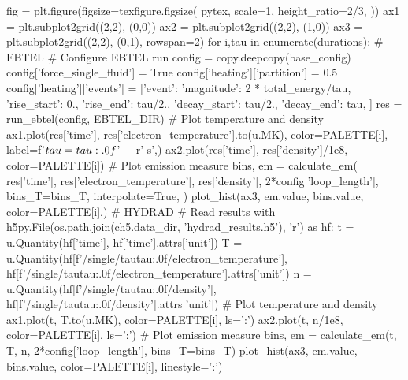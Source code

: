 \begin{pycode}[chapter5]
fig = plt.figure(figsize=texfigure.figsize(
    pytex,
    scale=1,
    height_ratio=2/3,
))
ax1 = plt.subplot2grid((2,2), (0,0))
ax2 = plt.subplot2grid((2,2), (1,0))
ax3 = plt.subplot2grid((2,2), (0,1), rowspan=2)
for i,tau in enumerate(durations):
    # EBTEL
    # Configure EBTEL run
    config = copy.deepcopy(base_config)
    config['force_single_fluid'] = True
    config['heating']['partition'] = 0.5
    config['heating']['events'] = [{'event': {
        'magnitude': 2 * total_energy/tau,
        'rise_start': 0.,
        'rise_end': tau/2.,
        'decay_start': tau/2.,
        'decay_end': tau,
    }}]
    res = run_ebtel(config, EBTEL_DIR)
    # Plot temperature and density
    ax1.plot(res['time'], res['electron_temperature'].to(u.MK), color=PALETTE[i],
             label=f'$\\tau={tau:.0f}$' + r' \si{\second}',)
    ax2.plot(res['time'], res['density']/1e8, color=PALETTE[i])
    # Plot emission measure
    bins, em = calculate_em(
        res['time'],
        res['electron_temperature'],
        res['density'],
        2*config['loop_length'],
        bins_T=bins_T,
        interpolate=True,
    )
    plot_hist(ax3, em.value, bins.value, color=PALETTE[i],)
    # HYDRAD
    # Read results
    with h5py.File(os.path.join(ch5.data_dir, 'hydrad_results.h5'), 'r') as hf:
        t = u.Quantity(hf['time'], hf['time'].attrs['unit'])
        T = u.Quantity(hf[f'/single/tau{tau:.0f}/electron_temperature'],
                       hf[f'/single/tau{tau:.0f}/electron_temperature'].attrs['unit'])
        n = u.Quantity(hf[f'/single/tau{tau:.0f}/density'],
                       hf[f'/single/tau{tau:.0f}/density'].attrs['unit'])
    # Plot temperature and density
    ax1.plot(t, T.to(u.MK), color=PALETTE[i], ls=':')
    ax2.plot(t, n/1e8, color=PALETTE[i], ls=':')
    # Plot emission measure
    bins, em = calculate_em(t, T, n, 2*config['loop_length'], bins_T=bins_T)
    plot_hist(ax3, em.value, bins.value, color=PALETTE[i], linestyle=':')
    

\end{pycode}
